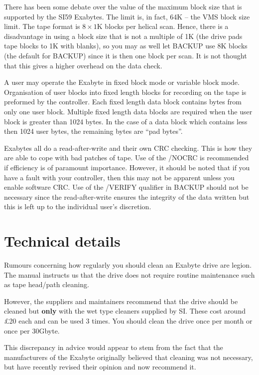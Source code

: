 There has been some debate over the value of the maximum block size  that is
supported by the SI59 Exabytes. The limit is, in fact, 64K -- the VMS block size
limit. The tape format is $8 \times 1$K blocks
per helical scan. Hence, there is a disadvantage in using a block size that is not
a multiple of 1K (the drive pads tape blocks to 1K with blanks), so you may as well
let BACKUP use 8K blocks (the default for BACKUP) since it is then one block per
scan. It is not thought that this gives a higher overhead on the data check.

A user may operate the Exabyte in fixed block mode or variable block mode.
Organisation of user blocks into fixed length blocks for recording on the tape
is preformed by the controller. Each fixed length data block contains bytes
from only one user block. Multiple fixed length data blocks are required 
when the user block is greater than 1024 bytes. In the case of a data block
which contains less then 1024 user bytes, the remaining bytes are 
``pad bytes''.

Exabytes all do a read-after-write and their own CRC checking. This is how 
they are able to cope with bad patches of tape. Use of the /NOCRC is
recommended if efficiency is of paramount importance. However, it should be
noted that if you have a fault with your controller, then this may not be
apparent unless you enable software CRC. 
Use of the /VERIFY qualifier in BACKUP should not be
necessary since the read-after-write ensures the integrity of the data
written but this is left up to the individual user's discretion.

\section{ Technical details}

Rumours concerning how regularly you should clean an Exabyte drive are legion.
The manual instructs us that the drive does not require routine maintenance
such as tape head/path cleaning.

However, the suppliers and maintainers recommend that the drive should be 
cleaned but {\bf only} with the wet type cleaners supplied by SI. These cost
around \pounds 20 each and can be used 3 times. You should clean the drive once
per month or once per 30Gbyte.
    
This discrepancy in advice would appear to stem from the fact that the manufacturers of
the Exabyte originally believed that cleaning was not necessary, but have
recently revised their opinion and now recommend it.

